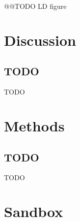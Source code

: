 \documentclass[a4paper,11pt,abstracton,hidelinks]{scrartcl}
\begin{document}
@@TODO LD figure


\section*{Discussion}


\subsection*{TODO}


TODO


\section*{Methods}


\subsection*{TODO}

TODO


\section*{Sandbox}
\end{document}
